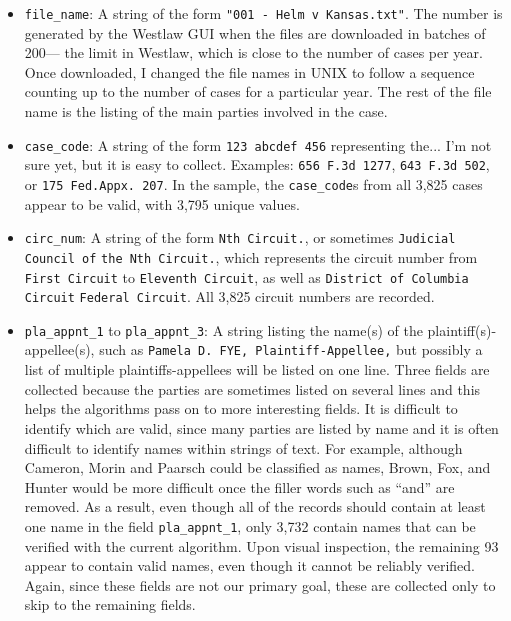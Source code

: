 \documentclass[11pt]{paper}
\begin{document}
\begin{itemize}
	\item \texttt{file\_name}: A string of the form 
		\texttt{"001 - Helm v Kansas.txt"}. 
		The number is generated by the Westlaw GUI 
		when the files are downloaded in batches of 200---%
		the limit in Westlaw, which is close to the number of cases per year. 
		Once downloaded, I changed the file names in UNIX to follow a sequence 
		counting up to the number of cases for a particular year. 
		The rest of the file name is the listing of the main parties involved 
		in the case. 

	\item \texttt{case\_code}: A string of the form \texttt{123 abcdef 456}
		representing the... I'm not sure yet, but it is easy to collect. 
		Examples: \texttt{656 F.3d 1277}, \texttt{643 F.3d 502}, 
		or \texttt{175 Fed.Appx. 207}. 
		In the sample, the \texttt{case\_code}s from all 3,825 cases appear to
		be valid, with 3,795 unique values. 

	\item \texttt{circ\_num}: A string of the form \texttt{Nth Circuit.}, 
		or sometimes \texttt{Judicial Council of} \texttt{the Nth Circuit.},
		which represents the circuit number 
		from \texttt{First Circuit} to \texttt{Eleventh Circuit}, 
		as well as \texttt{District of Columbia Circuit} \texttt{Federal Circuit}. 
		All 3,825 circuit numbers are recorded. 

	\item \texttt{pla\_appnt\_1} to \texttt{pla\_appnt\_3}: A string listing 
		the name(s) of the plaintiff(s)-appellee(s), 
		such as \texttt{Pamela D. FYE, Plaintiff-Appellee,} 
		but possibly a list of multiple plaintiffs-appellees will be listed on one line. 
		Three fields are collected because the parties are sometimes 
		listed on several lines and this helps the algorithms 
		pass on to more interesting fields. 
		It is difficult to identify which are valid, since many 
		parties are listed by name and it is often difficult 
		to identify names within strings of text.  
		For example, although Cameron, Morin and Paarsch could be 
		classified as names, Brown, Fox, and Hunter would be more difficult
		once the filler words such as ``and'' are removed. 
		As a result, even though all of the records
		should contain at least one name in the field \texttt{pla\_appnt\_1}, 
		only 3,732 contain names that can be verified with the current algorithm. 
		Upon visual inspection, the remaining 93 appear to contain 
		valid names, even though it cannot be reliably verified. 
		Again, since these fields are not our primary goal, 
		these are collected only to skip to the remaining fields.


\end{itemize}
\end{document}

